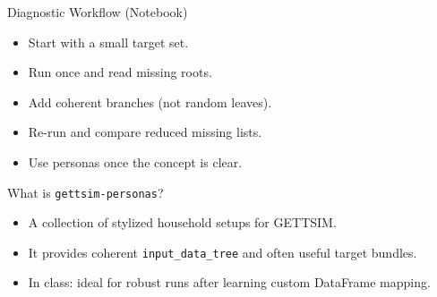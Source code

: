 \documentclass[aspectratio=169]{beamer}
\begin{document}
\begin{frame}{Diagnostic Workflow (Notebook)}
  \begin{itemize}
    \item Start with a small target set.
    \item Run once and read missing roots.
    \item Add coherent branches (not random leaves).
    \item Re-run and compare reduced missing lists.
    \item Use personas once the concept is clear.
  \end{itemize}
\end{frame}

\begin{frame}{What is \texttt{gettsim-personas}?}
  \begin{itemize}
    \item A collection of stylized household setups for GETTSIM.
    \item It provides coherent \texttt{input\_data\_tree} and often useful target bundles.
    \item In class: ideal for robust runs after learning custom DataFrame mapping.
  \end{itemize}
\end{frame}
\end{document}
